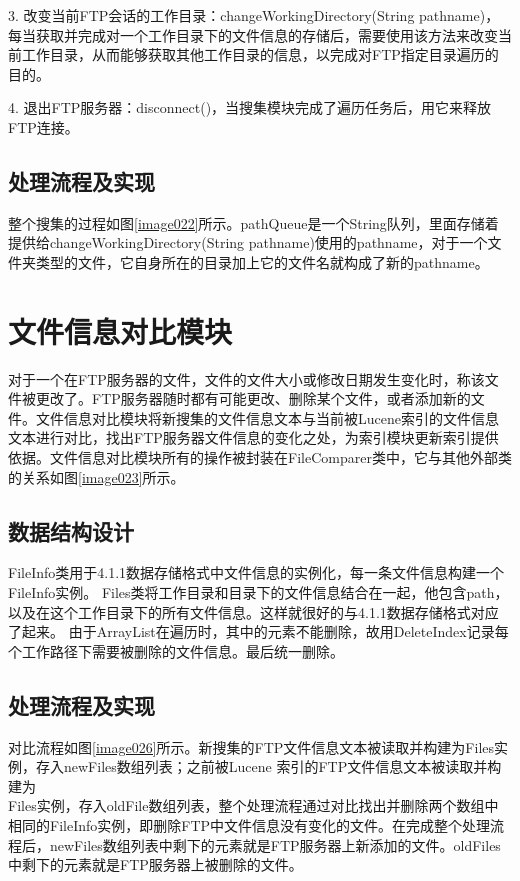 3. 改变当前FTP会话的工作目录：changeWorkingDirectory(String pathname)，每当获取并完成对一个工作目录下的文件信息的存储后，需要使用该方法来改变当前工作目录，从而能够获取其他工作目录的信息，以完成对FTP指定目录遍历的目的。

4. 退出FTP服务器：disconnect()，当搜集模块完成了遍历任务后，用它来释放FTP连接。
\subsection{处理流程及实现}
整个搜集的过程如图\ref{image022}所示。pathQueue是一个String队列，里面存储着提供给changeWorkingDirectory(String pathname)使用的pathname，对于一个文件夹类型的文件，它自身所在的目录加上它的文件名就构成了新的pathname。


\section{文件信息对比模块}
对于一个在FTP服务器的文件，文件的文件大小或修改日期发生变化时，称该文件被更改了。FTP服务器随时都有可能更改、删除某个文件，或者添加新的文件。文件信息对比模块将新搜集的文件信息文本与当前被Lucene索引的文件信息文本进行对比，找出FTP服务器文件信息的变化之处，为索引模块更新索引提供依据。文件信息对比模块所有的操作被封装在FileComparer类中，它与其他外部类的关系如图\ref{image023}所示。


\subsection{数据结构设计}
FileInfo类用于4.1.1数据存储格式中文件信息的实例化，每一条文件信息构建一个FileInfo实例。
Files类将工作目录和目录下的文件信息结合在一起，他包含path，以及在这个工作目录下的所有文件信息。这样就很好的与4.1.1数据存储格式对应了起来。
由于ArrayList在遍历时，其中的元素不能删除，故用Delete\-Index记录每个工作路径下需要被删除的文件信息。最后统一删除。
\subsection{处理流程及实现}
对比流程如图\ref{image026}所示。新搜集的FTP文件信息文本被读取并构建为Files实例，存入newFiles数组列表；之前被Lucene 索引的FTP文件信息文本被读取并构建为\\Files实例，存入oldFile数组列表，整个处理流程通过对比找出并删除两个数组中相同的FileInfo实例，即删除FTP中文件信息没有变化的文件。在完成整个处理流程后，newFiles数组列表中剩下的元素就是FTP服务器上新添加的文件。oldFiles中剩下的元素就是FTP服务器上被删除的文件。
\newpage
{}

